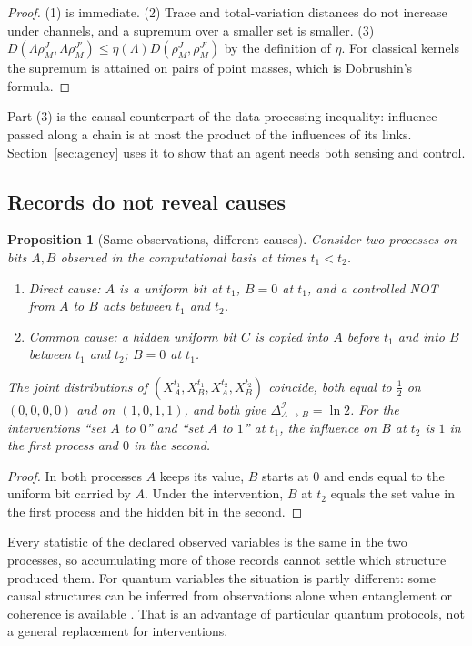 \documentclass[11pt,a4paper]{article}
\newtheorem{proposition}[definition]{Proposition}
\begin{document}
\begin{proof}
(1) is immediate. (2) Trace and total-variation distances do not increase under channels, and a supremum over a smaller set is smaller. (3) $D(\Lambda\rho_M^J,\Lambda\rho_M^{J'})\le\eta(\Lambda)D(\rho_M^J,\rho_M^{J'})$ by the definition of $\eta$. For classical kernels the supremum is attained on pairs of point masses, which is Dobrushin's formula.
\end{proof}

Part (3) is the causal counterpart of the data-processing inequality: influence passed along a chain is at most the product of the influences of its links. Section~\ref{sec:agency} uses it to show that an agent needs both sensing and control.

\subsection{Records do not reveal causes}

\begin{proposition}[Same observations, different causes]
\label{prop:same}
Consider two processes on bits $A,B$ observed in the computational basis at times $t_1<t_2$.
\begin{enumerate}
\item Direct cause: $A$ is a uniform bit at $t_1$, $B=0$ at $t_1$, and a controlled NOT from $A$ to $B$ acts between $t_1$ and $t_2$.
\item Common cause: a hidden uniform bit $C$ is copied into $A$ before $t_1$ and into $B$ between $t_1$ and $t_2$; $B=0$ at $t_1$.
\end{enumerate}
The joint distributions of $(X_A^{t_1},X_B^{t_1},X_A^{t_2},X_B^{t_2})$ coincide, both equal to $\frac12$ on $(0,0,0,0)$ and on $(1,0,1,1)$, and both give $\Delta^{\mathcal I}_{A\to B}=\ln2$. For the interventions ``set $A$ to $0$'' and ``set $A$ to $1$'' at $t_1$, the influence on $B$ at $t_2$ is $1$ in the first process and $0$ in the second.
\end{proposition}

\begin{proof}
In both processes $A$ keeps its value, $B$ starts at $0$ and ends equal to the uniform bit carried by $A$. Under the intervention, $B$ at $t_2$ equals the set value in the first process and the hidden bit in the second.
\end{proof}

Every statistic of the declared observed variables is the same in the
two processes, so accumulating more of those records cannot settle which
structure produced them. For quantum variables the situation is partly different: some causal structures can be inferred from observations alone when entanglement or coherence is available \cite{Ried2015}. That is an advantage of particular quantum protocols, not a general replacement for interventions.
\end{document}
